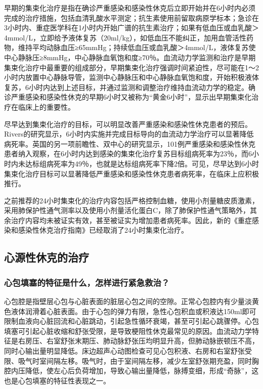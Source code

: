 早期的集束化治疗是指在确诊严重感染和感染性休克后立即开始并在6小时内必须完成的治疗措施，包括血清乳酸水平测定；抗生素使用前留取病原学标本；急诊在3小时内、重症医学科在1小时内开始广谱的抗生素治疗；如果有低血压或血乳酸＞4mmol/L，立即给予液体复苏（20ml/kg），如低血压不能纠正，加用血管活性药物，维持平均动脉血压≥65mmHg；持续低血压或血乳酸＞4mmol/L，液体复苏使中心静脉压≥8mmHg，中心静脉血氧饱和度≥70％。血流动力学监测和治疗是早期集束化治疗中最重要的组成部分，早期集束化治疗强调时间紧迫性，尽可能在1～2小时内放置中心静脉导管，监测中心静脉压和中心静脉血氧饱和度，开始积极液体复苏，6小时内达到上述目标，并通过监测和调整治疗维持血流动力学的稳定。确诊严重感染和感染性休克的早期6小时又被称为“黄金6小时”，显示出早期集束化治疗在临床上的重要性。

尽早达到集束化治疗的目标，可以明显改善严重感染和感染性休克患者的预后。Rivers的研究显示，6小时内实施并完成目标导向的血流动力学治疗可以显著降低病死率。英国的另一项前瞻性、双中心的研究显示，101例严重感染和感染性休克患者纳入观察，在6小时内达到感染的集束化治疗复苏目标组病死率为23％，而6小时内未达标组病死率为49％，也就是达标组病死率下降2倍。可见，尽早达到6小时集束化治疗目标可以显著降低严重感染和感染性休克患者病死率，在临床上应积极推行。

之前推荐的24小时集束化的治疗内容包括严格控制血糖，使用小剂量糖皮质激素，采用肺保护性通气测率以及使用小剂量活化蛋白C，除了肺保护性通气策略外，其余治疗内容均未被证实有效，甚至被证实为增加患者病死率。因此，新的《重症感染和感染性休克治疗指南》已经取消了24小时集束化治疗。

\subsection{心源性休克的治疗}

\subsubsection{心包填塞的特征是什么，怎样进行紧急救治？}

心包腔是指壁层心包与心脏表面的脏层心包之间的空隙。正常心包腔内有少量淡黄色液体润滑着心脏表面。由于心包的弹力有限，急性心包积血或积液达150ml即可限制血液向心脏回流和心脏跳动，引起急性循环衰竭，甚至可引起心跳骤停。心包填塞可引起心脏收缩和舒张受限，是导致梗阻性休克最常见的原因。血流动力学特征是右房压、右室舒张末期压、肺动脉舒张压均明显升高，但肺动脉嵌顿压不高，同时心输出量明显降低。床边超声心动图检查可见心包积液、右房和右室舒张受限、吸气时室间隔左移。吸气时，由于室间隔左移，减少左室舒张期充盈，同时胸腔内压降低，使左心后负荷增加，导致心输出量降低，脉搏变细，形成“奇脉”，这也是心包填塞的特征性表现之一。

